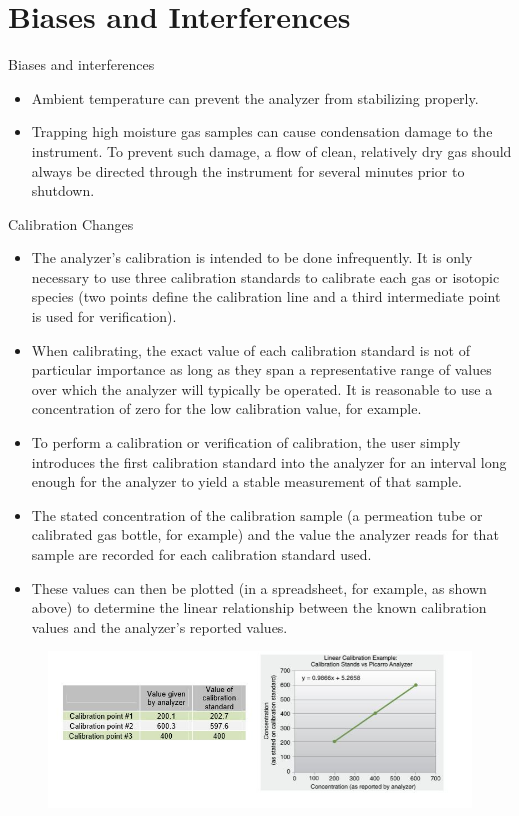 \documentclass[12pt]{../SOP3}\usepackage[]{graphicx}\usepackage[]{color}
\begin{document}
\section{Biases and Interferences}

\NP Biases and interferences

\begin{itemize} 
  \item Ambient temperature can prevent the analyzer from stabilizing properly.

  \item Trapping high moisture gas samples can cause condensation damage to the instrument. To prevent such damage, a flow of clean, relatively dry gas should always be directed through the instrument for several minutes prior to shutdown. 


\end{itemize}

\NP Calibration Changes
\begin{itemize}
  \item The analyzer's calibration is intended to be done infrequently. It is only necessary to use three calibration standards to calibrate each gas or isotopic species (two points define the calibration line and a third intermediate point is used for verification).

  \item When calibrating, the exact value of each calibration standard is not of particular importance as long as they span a representative range of values over which the analyzer will typically be operated. It is reasonable to use a concentration of zero for the low calibration value, for example. 
  \item To perform a calibration or verification of calibration, the user simply introduces the first calibration standard into the analyzer for an interval long enough for the analyzer to yield a stable measurement of that sample. 
  \item The stated concentration of the calibration sample (a permeation tube or calibrated gas bottle, for example) and the value the analyzer reads for that sample are recorded for each calibration standard used. 
  \item These values can then be plotted (in a spreadsheet, for example, as shown above) to determine the linear relationship between the known calibration values and the analyzer’s reported values.
\end{itemize}

\begin{figure}
\centering
  \includegraphics[width=1.0\textwidth]{"graphics/calibration"}
\end{figure}
\end{document}
